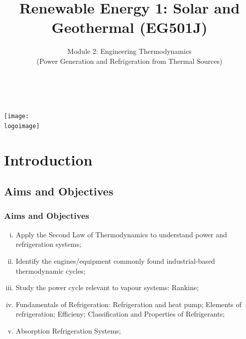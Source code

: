 \documentclass[10pt,compress]{beamer}
\institute{School of Engineering}
\title{Renewable Energy 1: Solar and Geothermal (EG501J)}
\subtitle{Module 2: Engineering Thermodynamics \\ (Power Generation and Refrigeration from Thermal Sources)}
\date[]{}
\author[\shortname]{%
  \fullname\\\ttfamily{\emailaddress}
}
\newcommand{\logoimage}{../FigBanner/UoAHorizBanner}
\begin{document}
\begin{frame}
  \titlepage
  \vfill%
  \begin{center}
    \texttt{[image: \\logoimage]}
  \end{center}
\end{frame}





\section{Introduction}

 \subsection{Aims and Objectives}
   \begin{frame}
     \frametitle{Aims and Objectives}
     \begin{enumerate}[(i)]
       \item <1-> Apply the Second Law of Thermodynamics to understand power and refrigeration systems;
       \item <1-> Identify the engines/equipment commonly found industrial-based thermodynamic cycles; 
       \item <1-> Study the power cycle relevant to vapour systems: Rankine; 
       \item <1-> Fundamentals of Refrigeration: Refrigeration and heat pump; Elements of refrigeration; Efficieny; Classification and Properties of Refrigerants;
       \item <1-> Absorption Refrigeration Systems;
 \end{enumerate}
   \end{frame}
\end{document}
